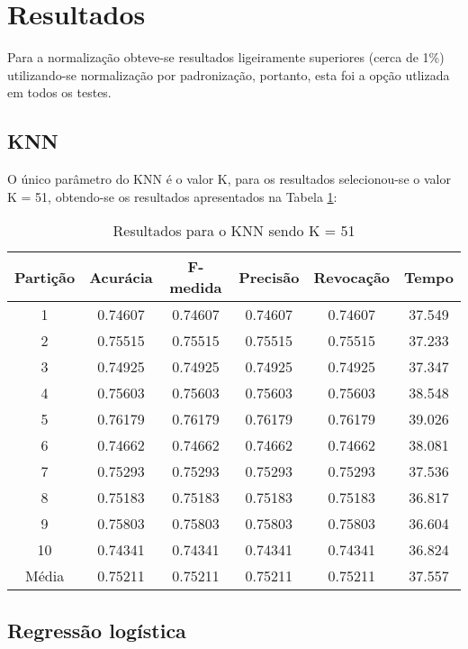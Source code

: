 \section{Resultados}

Para a normalização obteve-se resultados ligeiramente superiores (cerca de 1\%) utilizando-se normalização por padronização, portanto, esta foi a opção utlizada em todos os testes.

\subsection{KNN}

O único parâmetro do KNN é o valor K, para os resultados selecionou-se o valor K = 51, obtendo-se os resultados apresentados na Tabela \ref{table:resultadosKNN}:

\begin{table}[h]
\centering
\caption{Resultados para o KNN sendo K = 51}
\vspace{0.2cm}
\begin{tabular}{c|c|c|c|c|c}
Partição & Acurácia & F-medida & Precisão & Revocação & Tempo \\
\hline
1  & 0.74607 & 0.74607 & 0.74607 & 0.74607 & 37.549 \\     
2  & 0.75515 & 0.75515 & 0.75515 & 0.75515 & 37.233 \\     
3  & 0.74925 & 0.74925 & 0.74925 & 0.74925 & 37.347 \\     
4  & 0.75603 & 0.75603 & 0.75603 & 0.75603 & 38.548 \\     
5  & 0.76179 & 0.76179 & 0.76179 & 0.76179 & 39.026 \\     
6  & 0.74662 & 0.74662 & 0.74662 & 0.74662 & 38.081 \\     
7  & 0.75293 & 0.75293 & 0.75293 & 0.75293 & 37.536 \\     
8  & 0.75183 & 0.75183 & 0.75183 & 0.75183 & 36.817 \\     
9  & 0.75803 & 0.75803 & 0.75803 & 0.75803 & 36.604 \\     
10 & 0.74341 & 0.74341 & 0.74341 & 0.74341 & 36.824 \\
\hline
Média & 0.75211 & 0.75211 & 0.75211 & 0.75211 & 37.557

\end{tabular} 
\label{table:resultadosKNN}
\end{table}

\subsection{Regressão logística}

